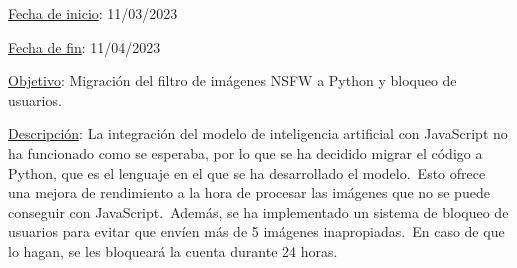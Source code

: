 
\underline{Fecha de inicio}: 11/03/2023

\underline{Fecha de fin}: 11/04/2023

\underline{Objetivo}:
Migración del filtro de imágenes NSFW a Python y bloqueo de usuarios.

\underline{Descripción}:
La integración del modelo de inteligencia artificial con JavaScript no ha funcionado como se esperaba, por lo que se
ha decidido migrar el código a Python, que es el lenguaje en el que se ha desarrollado el modelo.\ Esto ofrece
una mejora de rendimiento a la hora de procesar las imágenes que no se puede conseguir con JavaScript.\ Además, se
ha implementado un sistema de bloqueo de usuarios para evitar que envíen más de 5 imágenes inapropiadas.\ En caso de
que lo hagan, se les bloqueará la cuenta durante 24 horas.


